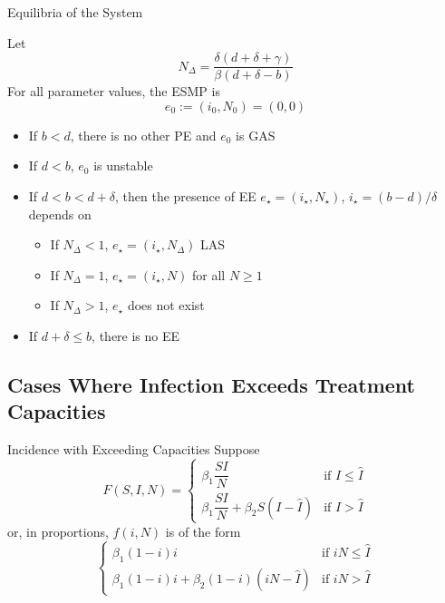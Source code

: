 \documentclass[aspectratio=169]{beamer}\usepackage[]{graphicx}\usepackage[]{xcolor}
\begin{document}
\begin{frame}{Equilibria of the System}
\begin{theorem}
Let
\[
N_\Delta=\frac{\delta(d+\delta+\gamma)}{\beta(d+\delta-b)}
\]
For all parameter values, the ESMP is
\[
e_0:=(i_0,N_0)=(0,0)
\]
\begin{itemize}
\item If $b<d$, there is no other PE and $e_0$ is GAS
\item If $d<b$, $e_0$ is unstable
\item If $d<b<d+\delta$, then the presence of EE $e_{\star}=(i_{\star},N_{\star})$, $i_{\star}=(b-d)/\delta$ depends on 
  \begin{itemize}
  \item If $N_\Delta<1$, $e_{\star}=(i_{\star},N_\Delta)$ LAS
  \item If $N_\Delta=1$, $e_{\star}=(i_{\star},N)$ for all $N\geq 1$
  \item If $N_\Delta>1$, $e_{\star}$ does not exist
  \end{itemize}
\item If $d+\delta\leq b$, there is no EE
\end{itemize}
\end{theorem}
\end{frame}

\subsection{Cases Where Infection Exceeds Treatment Capacities}

\begin{frame}{Incidence with Exceeding Capacities}
\bbullet Suppose
\begin{equation}
\tag{15}\label{eq:overcome_capacity}
F(S,I,N) = 
\begin{cases}
\beta_1 \dfrac{SI}{N} & \textrm{if }I\leq \hat{I} \\
\beta_1 \dfrac{SI}{N}+\beta_2 S(I-\hat{I}) & \textrm{if }I> \hat{I}
\end{cases}
\end{equation}
or, in proportions, $f(i,N)$ is of the form
\begin{equation}
\tag{16}\label{eq:overcome_capacity_proportions}
\begin{cases}
\beta_1 (1-i)i & \textrm{if }iN\leq \hat{I} \\
\beta_1 (1-i)i+\beta_2 (1-i)(iN-\hat{I}) & \textrm{if }iN> \hat{I}
\end{cases}
\end{equation}
\end{frame}
\end{document}
